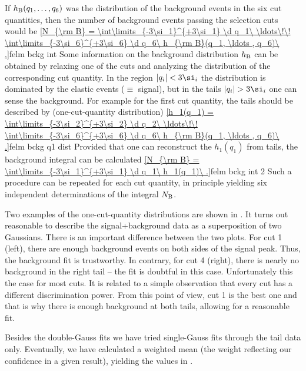 
If $h_{\rm B}(q_1, \ldots , q_6)$ was the distribution of the background events in the six cut quantities, then the number of background events passing the selection cuts would be
\eqref{N_{\rm B} = \int\limits_{-3\si_1}^{+3\si_1} \d q_1\ \ldots\!\! \int\limits_{-3\si_6}^{+3\si_6} \d q_6\  h_{\rm B}(q_1, \ldots , q_6)\ .}{felm bckg int}
Some information on the background distribution $h_{\rm B}$ can be obtained by relaxing one of the cuts and analyzing the distribution of the corresponding cut quantity. In the region $|q_i| < 3\si_i$ the distribution is dominated by the elastic events ($\equiv$ signal), but in the tails $|q_i|>3\si_i$ one can sense the background. For example for the first cut quantity, the tails should be described by (one-cut-quantity distribution)
\eqref{h_1(q_1) = \int\limits_{-3\si_2}^{+3\si_2} \d q_2\ \ldots\!\! \int\limits_{-3\si_6}^{+3\si_6} \d q_6\  h_{\rm B}(q_1, \ldots , q_6)\ .}{felm bckg q1 dist}
Provided that one can reconstruct the $h_1(q_1)$ from tails, the background integral can be calculated
\eqref{N_{\rm B} = \int\limits_{-3\si_1}^{+3\si_1} \d q_1\ h_1(q_1)\ .}{felm bckg int 2}
Such a procedure can be repeated for each cut quantity, in principle yielding six independent determinations of the integral $N_{\rm B}$.


Two examples of the one-cut-quantity distributions are shown in . It turns out reasonable to describe the signal+background data as a superposition of two Gaussians.
There is an important difference between the two plots. For cut 1 (left), there are enough background events on both sides of the signal peak. Thus, the background fit is trustworthy. In contrary, for cut 4 (right), there is nearly no background in the right tail -- the fit is doubtful in this case. Unfortunately this the case for most cuts. It is related to a simple observation that every cut has a different discrimination power. From this point of view, cut 1 is the best one and that is why there is enough background at both tails, allowing for a reasonable fit.

Besides the double-Gauss fits we have tried single-Gauss fits through the tail data only. Eventually, we have calculated a weighted mean (the weight reflecting our confidence in a given result), yielding the values in .

